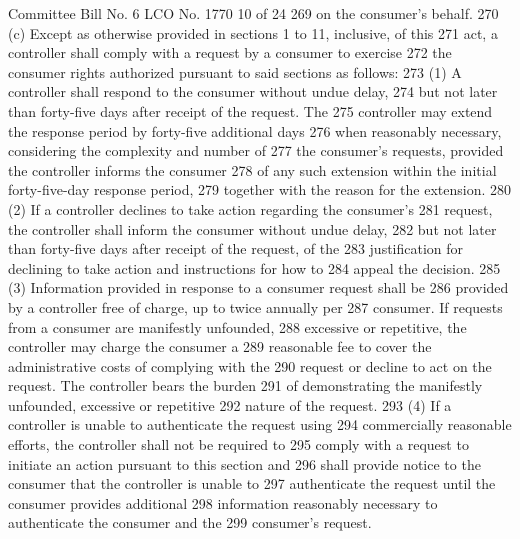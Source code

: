 Committee Bill No. 6
LCO No. 1770 10 of 24
269 on the consumer's behalf.
270 (c) Except as otherwise provided in sections 1 to 11, inclusive, of this
271 act, a controller shall comply with a request by a consumer to exercise
272 the consumer rights authorized pursuant to said sections as follows:
273 (1) A controller shall respond to the consumer without undue delay,
274 but not later than forty-five days after receipt of the request. The
275 controller may extend the response period by forty-five additional days
276 when reasonably necessary, considering the complexity and number of
277 the consumer's requests, provided the controller informs the consumer
278 of any such extension within the initial forty-five-day response period,
279 together with the reason for the extension.
280 (2) If a controller declines to take action regarding the consumer's
281 request, the controller shall inform the consumer without undue delay,
282 but not later than forty-five days after receipt of the request, of the
283 justification for declining to take action and instructions for how to
284 appeal the decision.
285 (3) Information provided in response to a consumer request shall be
286 provided by a controller free of charge, up to twice annually per
287 consumer. If requests from a consumer are manifestly unfounded,
288 excessive or repetitive, the controller may charge the consumer a
289 reasonable fee to cover the administrative costs of complying with the
290 request or decline to act on the request. The controller bears the burden
291 of demonstrating the manifestly unfounded, excessive or repetitive
292 nature of the request.
293 (4) If a controller is unable to authenticate the request using
294 commercially reasonable efforts, the controller shall not be required to
295 comply with a request to initiate an action pursuant to this section and
296 shall provide notice to the consumer that the controller is unable to
297 authenticate the request until the consumer provides additional
298 information reasonably necessary to authenticate the consumer and the
299 consumer's request.

